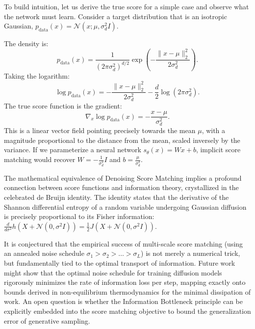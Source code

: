 To build intuition, let us derive the true score for a simple case and observe what the network must learn. Consider a target distribution that is an isotropic Gaussian, $p_{\text{data}}(x) = \mathcal{N}(x; \mu, \sigma_d^2 I)$. 

The density is:
\begin{equation}
    p_{\text{data}}(x) = \frac{1}{(2\pi \sigma_d^2)^{d/2}} \exp\left( -\frac{\|x - \mu\|_2^2}{2\sigma_d^2} \right).
\end{equation}
Taking the logarithm:
\begin{equation}
    \log p_{\text{data}}(x) = -\frac{\|x - \mu\|_2^2}{2\sigma_d^2} - \frac{d}{2} \log(2\pi \sigma_d^2).
\end{equation}
The true score function is the gradient:
\begin{equation}
    \nabla_x \log p_{\text{data}}(x) = -\frac{x - \mu}{\sigma_d^2}.
\end{equation}
This is a linear vector field pointing precisely towards the mean $\mu$, with a magnitude proportional to the distance from the mean, scaled inversely by the variance. If we parameterize a neural network $s_\theta(x) = W x + b$, implicit score matching would recover $W = -\frac{1}{\sigma_d^2}I$ and $b = \frac{\mu}{\sigma_d^2}$. 

\begin{horizon}
The mathematical equivalence of Denoising Score Matching implies a profound connection between score functions and information theory, crystallized in the celebrated de Bruijn identity. The identity states that the derivative of the Shannon differential entropy of a random variable undergoing Gaussian diffusion is precisely proportional to its Fisher information: $\frac{d}{d\sigma^2} h(X + \mathcal{N}(0, \sigma^2 I)) = \frac{1}{2} J(X + \mathcal{N}(0, \sigma^2 I))$. 

It is conjectured that the empirical success of multi-scale score matching (using an annealed noise schedule $\sigma_1 > \sigma_2 > \dots > \sigma_L$) is not merely a numerical trick, but fundamentally tied to the optimal transport of information. Future work might show that the optimal noise schedule for training diffusion models rigorously minimizes the rate of information loss per step, mapping exactly onto bounds derived in non-equilibrium thermodynamics for the minimal dissipation of work. An open question is whether the Information Bottleneck principle can be explicitly embedded into the score matching objective to bound the generalization error of generative sampling.
\end{horizon}


